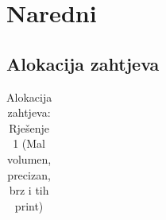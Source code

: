\documentclass[12pt]{article}
\begin{document}
\section{Naredni}
\subsection{Alokacija zahtjeva}

\begin{landscape}


\begin{table}[]
\scriptsize
  \centering
  \caption{Alokacija zahtjeva: Rješenje 1 (Mal volumen, precizan, brz i tih print)}
    \begin{tabular}{ccccccccc}


\end{tabular}
\end{table}
\end{landscape}
\end{document}
